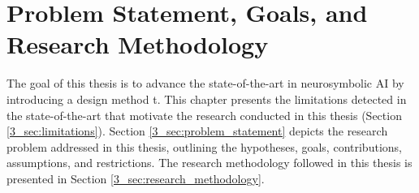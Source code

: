 \chapter{Problem Statement, Goals, and Research Methodology}\label{chap:methodology}

The goal of this thesis is to advance the state-of-the-art in neurosymbolic AI by introducing a design method t. This chapter presents the limitations detected in the state-of-the-art that motivate the research conducted in this thesis (Section \ref{3_sec:limitations}). Section \ref{3_sec:problem_statement} depicts the research problem addressed in this thesis, outlining the hypotheses, goals, contributions, assumptions, and restrictions. The research methodology followed in this thesis is presented in Section \ref{3_sec:research_methodology}.

